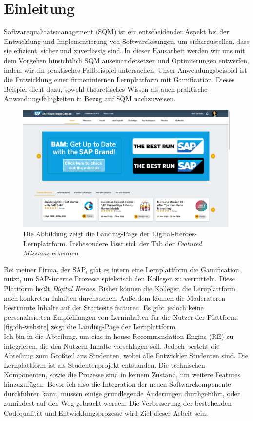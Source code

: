 \chapter{Einleitung}

Softwarequalitätsmanagement (SQM) ist ein entscheidender Aspekt bei der Entwicklung und Implementierung von Softwarelösungen, 
um sicherzustellen, dass sie effizient, sicher und zuverlässig sind. In dieser Hausarbeit werden wir uns mit dem Vorgehen 
hinsichtlich SQM auseinandersetzen und Optimierungen entwerfen, indem wir ein praktisches Fallbeispiel untersuchen. 
Unser Anwendungsbeispiel ist die Entwicklung einer firmeninternen Lernplattform mit Gamification. 
Dieses Beispiel dient dazu, sowohl theoretisches Wissen als auch praktische 
Anwendungsfähigkeiten in Bezug auf SQM nachzuweisen.

\begin{figure}
	\centering
	\includegraphics[width=1.\textwidth]{Bilder/dh-website.png} 
	\caption{Die Abbildung zeigt die Landing-Page der Digital-Heroes-Lernplattform. 
    Insbesondere lässt sich der Tab der \textit{Featured Missions} erkennen.}
	\label{fig:dh-website}
\end{figure} 

Bei meiner Firma, der SAP, gibt es intern eine Lernplattform die Gamification nutzt, um SAP-interne Prozesse 
spielerisch den Kollegen zu vermitteln. Diese Plattform heißt \textit{Digital Heroes}. 
Bisher können die Kollegen die Lernplattform nach konkreten Inhalten durchsuchen. 
Außerdem können die Moderatoren bestimmte Inhalte auf der Startseite featuren. Es gibt jedoch keine 
personalisierten Empfehlungen von Lerninhalten für die Nutzer der Plattform. 
\autoref{fig:dh-website} zeigt die Landing-Page der Lernplattform. \\
Ich bin in die Abteilung, um eine in-house Recommendation Engine (RE) zu integrieren, die den Nutzern Inhalte vorschlagen soll. 
Jedoch besteht die Abteilung zum Großteil aus Studenten, wobei alle Entwickler Studenten sind. 
Die Lernplattform ist als Studentenprojekt entstanden. 
Die technischen Komponenten, sowie die Prozesse sind in keinem Zustand, um weitere Features hinzuzufügen.
Bevor ich also die Integration der neuen Softwarekomponente durchführen kann, 
müssen einige grundlegende Änderungen durchgeführt, oder zumindest auf den Weg gebracht werden.
Die Verbesserung der bestehenden Codequalität und Entwicklungsprozesse wird Ziel dieser Arbeit sein.


